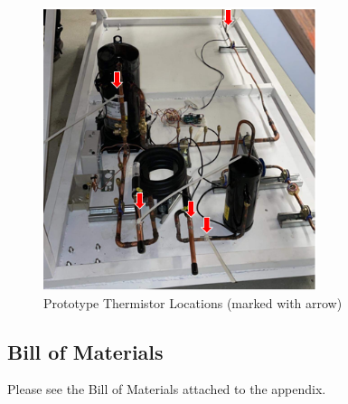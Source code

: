 \medskip
\begin{figure}[H]
    \centering
    \includegraphics[width=8cm]{images/prototype_daq_locations.png}
    \caption{Prototype Thermistor Locations (marked with arrow)}
\end{figure}

\subsection{Bill of Materials}

Please see the Bill of Materials attached to the appendix.